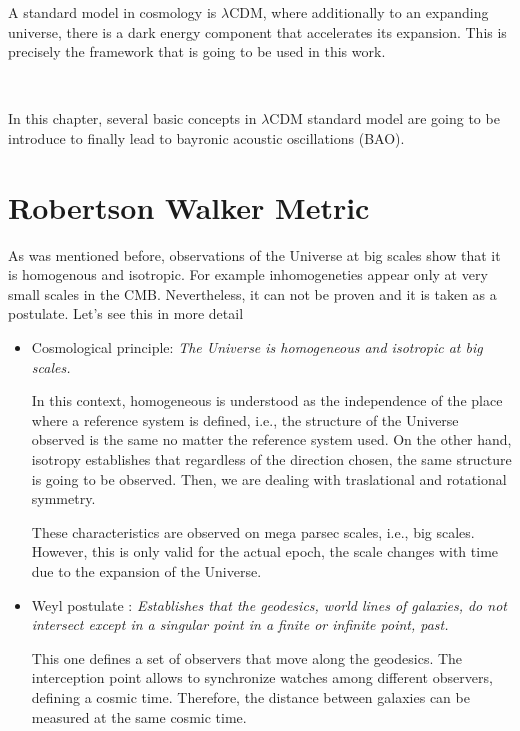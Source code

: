 A standard model in cosmology is $\lambda$CDM, where additionally to an 
expanding universe, there is a dark energy component that accelerates 
its expansion. This is precisely the framework that is going to 
be used in this work. 

\

In this chapter, several basic concepts in $\lambda$CDM standard model are going to 
be introduce to finally lead to bayronic acoustic oscillations (BAO). 

\section{ Robertson Walker Metric}

As was mentioned before, observations of the Universe at big scales show 
that it is homogenous and isotropic. For example inhomogeneties appear only 
at very small scales in the CMB. Nevertheless, it can not be proven and it is taken
as a postulate. Let's see this in more detail

\begin{itemize}
\item Cosmological principle: \emph{ The Universe is homogeneous and isotropic 
at big scales.}

In this context, homogeneous is understood as the independence of the place 
where a reference system is defined, i.e., the structure of the Universe observed 
is the same no matter the reference system used. 
On the other hand, isotropy establishes that regardless of the direction chosen, 
the same structure is going to be observed. Then, we are dealing with traslational
and rotational symmetry. 

These characteristics are observed on mega parsec scales, i.e., big scales. 
However, this is only valid for the actual epoch, the scale changes with time due 
to the expansion of the Universe. 


\item Weyl postulate :\emph{ Establishes that the geodesics, world lines of 
galaxies, do not intersect except in a singular point in a finite or infinite 
point, past.} 

This one defines a set of observers that move along the geodesics. 
The interception point allows to synchronize watches among different observers,
defining a cosmic time. Therefore, the distance between galaxies can
be measured at the same cosmic time. 

\end{itemize} 

